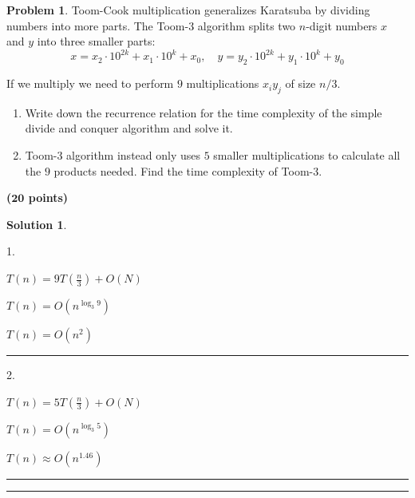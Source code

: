 \documentclass{article}
\theoremstyle{definition}
\newtheorem{problem}{Problem}
\def\fline{\rule{0.75\linewidth}{0.5pt}}
\newcommand{\finishline}{
  \begin{center}\fline
\end{center}}
\newtheorem*{solution*}{Solution}
\newenvironment{solution}{
\begin{solution*}}{{\finishline}
\end{solution*}}
\newcommand{\grade}[1]{\hfill{\textbf{($\mathbf{#1}$ points)}}}
\begin{document}
  \begin{problem}
    Toom-Cook multiplication generalizes Karatsuba by dividing numbers into more parts. The Toom-3 algorithm splits two $n$-digit numbers $x$ and $y$ into three smaller parts:
    \[
      x = x_2 \cdot 10^{2k} + x_1 \cdot 10^k + x_0, \quad y = y_2 \cdot 10^{2k} + y_1 \cdot 10^k + y_0
    \]

    If we multiply we need to perform $9$  multiplications $x_iy_j$ of size $n/3$.

    \begin{enumerate}
      \item Write down the recurrence relation for the time complexity of the simple divide and conquer algorithm and solve it.

      \item Toom-3 algorithm instead only uses $5$ smaller multiplications to calculate all the $9$ products needed. Find the time complexity of Toom-3.

    \end{enumerate}

  \end{problem}\grade{20}
  \begin{solution}
    \

    1.

    $T(n) = 9T(\frac{n}{3}) + O(N)$

    $T(n) = O(n^{\log_3 9})$

    $T(n) = O(n^{2})$

    \hrule
    2.

    $T(n) = 5T(\frac{n}{3}) + O(N)$

    $T(n) = O(n^{\log_3 5})$

    $T(n) \approx O(n^{1.46})$
  \end{solution}

  \finishline
\end{document}
